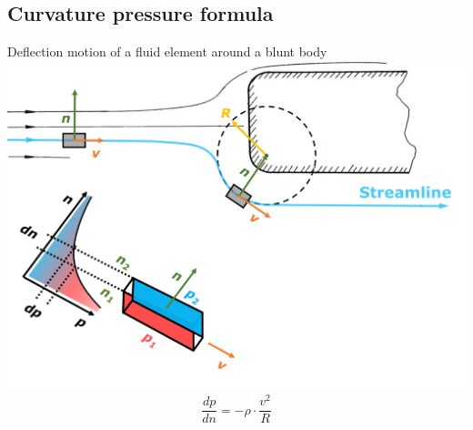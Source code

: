 \documentclass{article}
\begin{document}
\begin{multicols}{2}
\subsection{Curvature pressure formula}
\begin{examplebox}{Deflection motion of a fluid element around a blunt body}
    \includegraphics[width=\textwidth]{media/pressure_curvatur.png}
    \vspace*{-0.6cm}
    \begin{equation}
        \dfrac{dp}{dn} = -\rho\cdot\dfrac{v^2}{R}
    \end{equation}
\end{examplebox}

\vfill
\phantom{}
\end{multicols}
\end{document}
